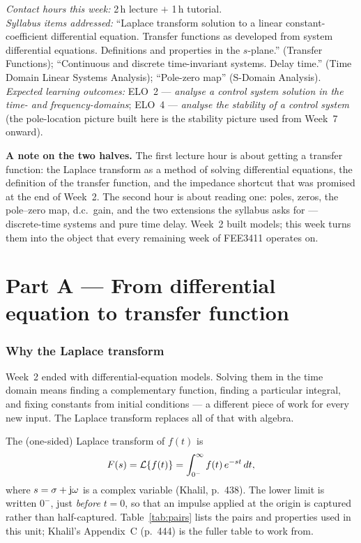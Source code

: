 \documentclass[11pt,a4paper]{article}
\begin{document}
\noindent
\emph{Contact hours this week:} 2\,h lecture $+$ 1\,h tutorial.\\
\emph{Syllabus items addressed:} ``Laplace transform solution to a linear
constant-coefficient differential equation. Transfer functions as developed
from system differential equations. Definitions and properties in the
$s$-plane.'' (Transfer Functions); ``Continuous and discrete time-invariant
systems. Delay time.'' (Time Domain Linear Systems Analysis); ``Pole-zero
map'' (S-Domain Analysis).\\
\emph{Expected learning outcomes:} ELO~2 --- \emph{analyse a control system
solution in the time- and frequency-domains}; ELO~4 --- \emph{analyse the
stability of a control system} (the pole-location picture built here is the
stability picture used from Week~7 onward).

\bigskip
\noindent
\textbf{A note on the two halves.} The first lecture hour is about getting a
transfer function: the Laplace transform as a method of solving differential
equations, the definition of the transfer function, and the impedance shortcut
that was promised at the end of Week~2. The second hour is about reading one:
poles, zeros, the pole--zero map, d.c.\ gain, and the two extensions the
syllabus asks for --- discrete-time systems and pure time delay. Week~2 built
models; this week turns them into the object that every remaining week of
FEE3411 operates on.

\part*{Part A --- From differential equation to transfer function}

\section{Why the Laplace transform}
\label{sec:laplace}

Week~2 ended with differential-equation models. Solving them in the time domain
means finding a complementary function, finding a particular integral, and
fixing constants from initial conditions --- a different piece of work for every
new input. The Laplace transform replaces all of that with algebra.

The (one-sided) Laplace transform of $f(t)$ is
\begin{equation}
  F(s) = \mathcal{L}\{f(t)\} = \int_{0^-}^{\infty} f(t)\,e^{-st}\,dt ,
  \label{eq:laplace-def}
\end{equation}
where $s=\sigma+\mathrm{j}\omega$ is a complex variable (Khalil, p.~438). The lower limit is
written $0^-$, just \emph{before} $t=0$, so that an impulse applied at the
origin is captured rather than half-captured. Table~\ref{tab:pairs} lists the
pairs and properties used in this unit; Khalil's Appendix~C (p.~444) is the
fuller table to work from.
\end{document}

